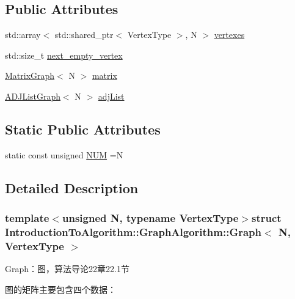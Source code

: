\subsection*{Public Attributes}
\begin{DoxyCompactItemize}
\item 
std\+::array$<$ std\+::shared\+\_\+ptr$<$ Vertex\+Type $>$, N $>$ \hyperlink{struct_introduction_to_algorithm_1_1_graph_algorithm_1_1_graph_a72c79fda857c79493d145acb18e64924}{vertexes}
\item 
std\+::size\+\_\+t \hyperlink{struct_introduction_to_algorithm_1_1_graph_algorithm_1_1_graph_a5bed015eecaef2f404e8497978043038}{next\+\_\+empty\+\_\+vertex}
\item 
\hyperlink{struct_introduction_to_algorithm_1_1_graph_algorithm_1_1_matrix_graph}{Matrix\+Graph}$<$ N $>$ \hyperlink{struct_introduction_to_algorithm_1_1_graph_algorithm_1_1_graph_abf4186d5ed3b2c93da5f7fef6342f987}{matrix}
\item 
\hyperlink{struct_introduction_to_algorithm_1_1_graph_algorithm_1_1_a_d_j_list_graph}{A\+D\+J\+List\+Graph}$<$ N $>$ \hyperlink{struct_introduction_to_algorithm_1_1_graph_algorithm_1_1_graph_a26d958d3e8e2bb20682d98b13b2d54fc}{adj\+List}
\end{DoxyCompactItemize}
\subsection*{Static Public Attributes}
\begin{DoxyCompactItemize}
\item 
static const unsigned \hyperlink{struct_introduction_to_algorithm_1_1_graph_algorithm_1_1_graph_a42850b5cb5e754cb4e6e67ae1aa53197}{N\+U\+M} =N
\end{DoxyCompactItemize}


\subsection{Detailed Description}
\subsubsection*{template$<$unsigned N, typename Vertex\+Type$>$struct Introduction\+To\+Algorithm\+::\+Graph\+Algorithm\+::\+Graph$<$ N, Vertex\+Type $>$}

Graph：图，算法导论22章22.1节 

图的矩阵主要包含四个数据：


